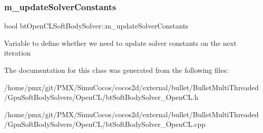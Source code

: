 \subsubsection{\texorpdfstring{m\+\_\+update\+Solver\+Constants}{m\_updateSolverConstants}}
{\footnotesize\ttfamily bool bt\+Open\+C\+L\+Soft\+Body\+Solver\+::m\+\_\+update\+Solver\+Constants\hspace{0.3cm}{\ttfamily [protected]}}

Variable to define whether we need to update solver constants on the next iteration 

The documentation for this class was generated from the following files\+:\begin{DoxyCompactItemize}
\item 
/home/pmx/git/\+P\+M\+X/\+Simu\+Cocos/cocos2d/external/bullet/\+Bullet\+Multi\+Threaded/\+Gpu\+Soft\+Body\+Solvers/\+Open\+C\+L/bt\+Soft\+Body\+Solver\+\_\+\+Open\+C\+L.\+h\item 
/home/pmx/git/\+P\+M\+X/\+Simu\+Cocos/cocos2d/external/bullet/\+Bullet\+Multi\+Threaded/\+Gpu\+Soft\+Body\+Solvers/\+Open\+C\+L/bt\+Soft\+Body\+Solver\+\_\+\+Open\+C\+L.\+cpp\end{DoxyCompactItemize}
